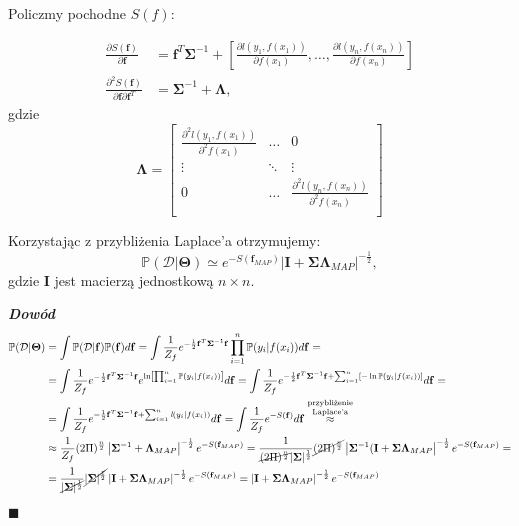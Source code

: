 \documentclass[12pt,a4paper]{article}
\newenvironment{dow}{\textbf{\textit{Dowód}}}{\begin{flushright} $\blacksquare$ \end{flushright}}
\begin{document}
Policzmy pochodne $S(f)$:

\begin{align*}
\frac{\partial S(\mathbf{f})}{\partial \mathbf{f}} &=
\mathbf{f}^T\mathbf{\Sigma}^{-1} + \left[ \frac{\partial\textit{l}(y_1, f(x_1))}{\partial f(x_1)}, \ldots, \frac{\partial\textit{l}(y_n, f(x_n))}{\partial f(x_n)} \right] \\
\frac{\partial^2 S(\mathbf{f})}{\partial \mathbf{f}\partial \mathbf{f}^T} &= 
\mathbf{\Sigma}^{-1}+\mathbf{\Lambda},
\end{align*}
gdzie 
$$
\mathbf{\Lambda} = 
	\left[
        \begin{array}{ccc}
         \frac{\partial^2\textit{l}(y_1, f(x_1))}{\partial^2 f(x_1)} & \ldots & 0\\
         \vdots & \ddots & \vdots \\
         0 & \ldots & \frac{\partial^2\textit{l}(y_n, f(x_n))}{\partial^2 f(x_n)} \\
        \end{array}
    \right] 
$$

Korzystając z przybliżenia Laplace'a otrzymujemy:
$$
\mathbb{P}(\mathcal{D}|\mathbf{\Theta}) \simeq e^{-S(\mathbf{f}_{MAP})} \left\vert \mathbf{I} + \mathbf{\Sigma}\mathbf{\Lambda}_{MAP} \right\vert^{-\frac{1}{2}},
$$
gdzie $\mathbf{I}$ jest macierzą jednostkową $n\times n$.

\begin{dow}
\begin{align*}
\mathbb{P}(\mathcal{D}|\mathbf{\Theta}) &= 
\int \mathbb{P}(\mathcal{D}|\mathbf{f})\mathbb{P}(\mathbf{f}) d\mathbf{f} =
\int  \frac{1}{Z_f}e^{-\frac{1}{2}\mathbf{f}^T\mathbf{\Sigma}^{-1}\mathbf{f}}\prod_{i=1}^n\mathbb{P}(y_i|f(x_i)) d\mathbf{f} = \\  &=
\int  \frac{1}{Z_f}e^{-\frac{1}{2}\mathbf{f}^T\mathbf{\Sigma}^{-1}\mathbf{f}}e^{\ln\left[\prod_{i=1}^n\mathbb{P}(y_i|f(x_i))\right]} d\mathbf{f} =
\int  \frac{1}{Z_f}e^{-\frac{1}{2}\mathbf{f}^T\mathbf{\Sigma}^{-1}\mathbf{f}+\sum_{i=1}^n\left[-\ln\mathbb{P}(y_i|f(x_i))\right]} d\mathbf{f} = \\ &=
\int  \frac{1}{Z_f}e^{-\frac{1}{2}\mathbf{f}^T\mathbf{\Sigma}^{-1}\mathbf{f}+\sum_{i=1}^n\textit{l}(y_i|f(x_i))} d\mathbf{f} =
\int  \frac{1}{Z_f}e^{-S(\mathbf{f})}d\mathbf{f} \stackrel{\text{przybliżenie}}{\stackrel{\text{Laplace'a}}{\approx}} \\ &\approx
\frac{1}{Z_f}(2\Pi)^{\frac{n}{2}} \left\vert \mathbf{\Sigma}^{-1}+\mathbf{\Lambda}_{MAP} \right\vert^{-\frac{1}{2}}e^{-S(\mathbf{f}_{MAP})} =
\frac{1}{\cancel{(2\Pi)^{\frac{n}{2}}}|\mathbf{\Sigma}|^{\frac{1}{2}}}\cancel{(2\Pi)^{\frac{n}{2}}} \left\vert \mathbf{\Sigma}^{-1}(\mathbf{I}+\mathbf{\Sigma}\mathbf{\Lambda}_{MAP} \right\vert^{-\frac{1}{2}}e^{-S(\mathbf{f}_{MAP})} = \\ &=
\frac{1}{\cancel{|\mathbf{\Sigma}|^{\frac{1}{2}}}} \cancel{|\mathbf{\Sigma}|^{\frac{1}{2}}}\left\vert \mathbf{I}+\mathbf{\Sigma}\mathbf{\Lambda}_{MAP} \right\vert^{-\frac{1}{2}}e^{-S(\mathbf{f}_{MAP})} =
\left\vert \mathbf{I}+\mathbf{\Sigma}\mathbf{\Lambda}_{MAP} \right\vert^{-\frac{1}{2}}e^{-S(\mathbf{f}_{MAP})}
\end{align*}
\end{dow}
\end{document}
